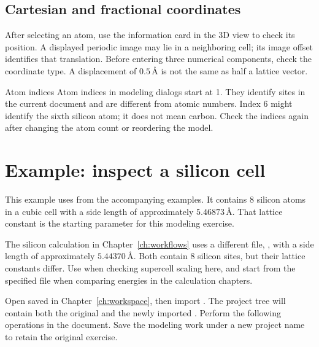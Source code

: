 \subsection{Cartesian and fractional coordinates}



After selecting an atom, use the information card in the 3D view to check its position. A displayed periodic image may lie in a neighboring cell; its image offset identifies that translation. Before entering three numerical components, check the coordinate type. A displacement of $0.5\,\text{\AA}$ is not the same as half a lattice vector.

\begin{notebox}{Atom indices}
Atom indices in modeling dialogs start at 1. They identify sites in the current document and are different from atomic numbers. Index 6 might identify the sixth silicon atom; it does not mean carbon. Check the indices again after changing the atom count or reordering the model.
\end{notebox}

\section{Example: inspect a silicon cell}

This example uses \mbox{} from the accompanying examples. It contains 8 silicon atoms in a cubic cell with a side length of approximately $5.46873\,\text{\AA}$. That lattice constant is the starting parameter for this modeling exercise.

The silicon calculation in Chapter~\ref{ch:workflows} uses a different file, , with a side length of approximately $5.44370\,\text{\AA}$. Both contain 8 silicon sites, but their lattice constants differ. Use \mbox{} when checking supercell scaling here, and start from the specified file when comparing energies in the calculation chapters.

Open  saved in Chapter~\ref{ch:workspace}, then import . The project tree will contain both the original  and the newly imported . Perform the following operations in the  document. Save the modeling work under a new project name to retain the original exercise.

